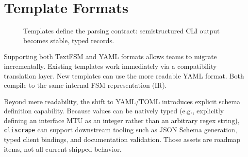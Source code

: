 \documentclass[a4paper,10pt]{article}
\begin{document}

\section{Template Formats}
\label{sec:templates}

\begin{figure}[H]
\centering
{}
\caption{Templates define the parsing contract: semistructured CLI output becomes stable, typed records.}
\label{fig:cs-templates}
\end{figure}

Supporting both TextFSM and YAML formats allows teams to migrate incrementally. Existing templates work immediately via a compatibility translation layer. New templates can use the more readable YAML format. Both compile to the same internal \ac{FSM} representation (IR).

Beyond mere readability, the shift to YAML/TOML introduces explicit schema definition capability. Because values can be natively typed (e.g., explicitly defining an interface MTU as an integer rather than an arbitrary regex string), \texttt{cliscrape} can support downstream tooling such as JSON Schema generation, typed client bindings, and documentation validation. Those assets are roadmap items, not all current shipped behavior.
\end{document}
